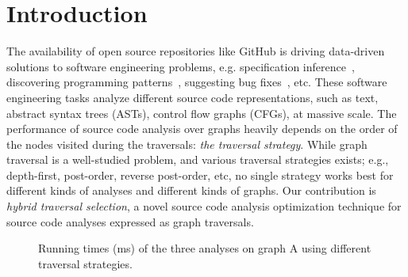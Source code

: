 \chapter{Introduction}
\label{sec:introduction}

The availability of open source repositories like GitHub is driving
data-driven solutions to software engineering problems, e.g.
specification inference~\cite{nguyen2014mining}, discovering programming
patterns~\cite{thummalapenta2009alattin}, suggesting bug
fixes~\cite{livshits2005dynamine,cpminer}, etc.
These software engineering tasks analyze different source code
representations, such as text, abstract syntax trees (ASTs), control
flow graphs (CFGs), at massive scale.
The performance of source code analysis over graphs heavily depends on
the order of the nodes visited during the traversals: {\em the
traversal strategy}. While graph traversal is a well-studied problem,
and various traversal strategies exists; e.g., depth-first,
post-order, reverse post-order, etc, no single strategy works best for
different kinds of analyses and different kinds of graphs.
Our contribution is {\em hybrid traversal selection}, a
novel source code analysis optimization technique for source code
analyses expressed as graph traversals.

\begin{figure}[t]
\centering
{}
\caption{Running times (ms) of the three analyses on graph A using different traversal strategies.}
\label{fig:example-a-graph}
\end{figure}

